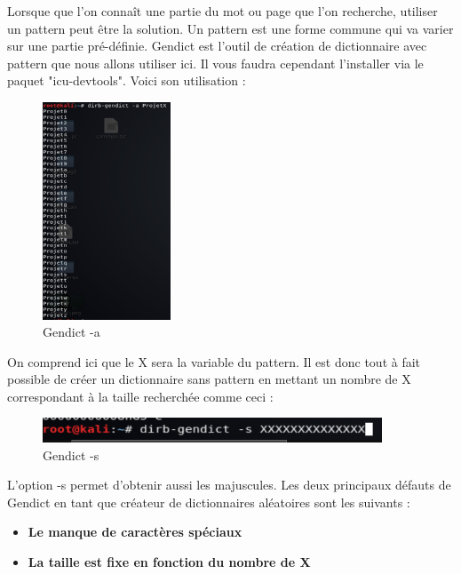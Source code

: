 Lorsque que l'on connaît une partie du mot ou page que l'on recherche, utiliser un pattern peut être la solution. Un pattern est une forme commune qui va varier sur une partie pré-définie. Gendict est l'outil de création de dictionnaire avec pattern que nous allons utiliser ici. Il vous faudra cependant l'installer via le paquet "icu-devtools". Voici son utilisation :

\begin{figure}[htp!]
  \centering
  \setlength\figureheight{7cm}
  \setlength\figurewidth{9cm}
  \includegraphics[width=0.34\textwidth]{oui/images/Dirb/gendict.PNG}
  \caption{Gendict -a}
  \label{fig:courbe-tikz}
\end{figure}

On comprend ici que le X sera la variable du pattern. Il est donc tout à fait possible de créer un dictionnaire sans pattern en mettant un nombre de X correspondant à la taille recherchée comme ceci :

\begin{figure}[htp!]
  \centering
  \setlength\figureheight{7cm}
  \setlength\figurewidth{9cm}
  \includegraphics[width=0.9\textwidth]{oui/images/Dirb/dicoaleatoire.PNG}
  \caption{Gendict -s}
  \label{fig:courbe-tikz}
\end{figure}

L'option -s permet d'obtenir aussi les majuscules. Les deux principaux défauts de Gendict en tant que créateur de dictionnaires aléatoires sont les suivants :

\begin{itemize}
    \item \textbf{Le manque de caractères spéciaux}
    \item \textbf{La taille est fixe en fonction du nombre de X}
\end{itemize}

